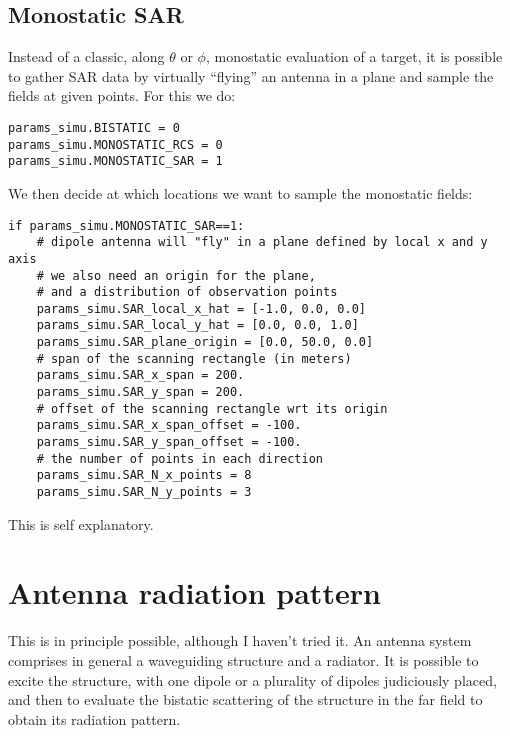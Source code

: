 \documentclass[a4paper,10pt]{book}
\begin{document}
\subsection{Monostatic SAR}
%
\par
Instead of a classic, along $\theta$ or $\phi$, monostatic evaluation of a target, it is possible to gather SAR data by virtually ``flying'' an antenna in a plane and sample the fields at given points. For this we do:
\begin{verbatim}
params_simu.BISTATIC = 0
params_simu.MONOSTATIC_RCS = 0
params_simu.MONOSTATIC_SAR = 1
\end{verbatim}
%
\par
We then decide at which locations we want to sample the monostatic fields:
\begin{verbatim}
if params_simu.MONOSTATIC_SAR==1:
    # dipole antenna will "fly" in a plane defined by local x and y axis
    # we also need an origin for the plane, 
    # and a distribution of observation points
    params_simu.SAR_local_x_hat = [-1.0, 0.0, 0.0]
    params_simu.SAR_local_y_hat = [0.0, 0.0, 1.0]
    params_simu.SAR_plane_origin = [0.0, 50.0, 0.0]
    # span of the scanning rectangle (in meters)
    params_simu.SAR_x_span = 200.
    params_simu.SAR_y_span = 200.
    # offset of the scanning rectangle wrt its origin
    params_simu.SAR_x_span_offset = -100.
    params_simu.SAR_y_span_offset = -100.
    # the number of points in each direction
    params_simu.SAR_N_x_points = 8
    params_simu.SAR_N_y_points = 3
\end{verbatim}
This is self explanatory. 


\section{Antenna radiation pattern}
%
\par
This is in principle possible, although I haven't tried it. An antenna system comprises in general a waveguiding structure and a radiator. It is possible to excite the structure, with one dipole or a plurality of dipoles judiciously placed, and then to evaluate the bistatic scattering of the structure in the far field to obtain its radiation pattern.



\end{document}
